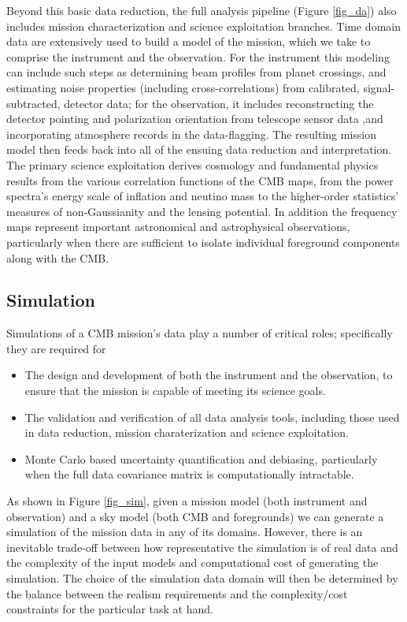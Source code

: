 Beyond this basic data reduction, the full analysis pipeline (Figure \ref{fig_da}) also includes mission characterization and science exploitation branches. Time domain data are extensively used to build a model of the mission, which we take to comprise the instrument and the observation. For the instrument this modeling can include such steps as determining beam profiles from planet crossings, and estimating noise properties (including cross-correlations) from calibrated, signal-subtracted, detector data; for the observation, it includes reconstructing the detector pointing and polarization orientation from telescope sensor data ,and incorporating atmosphere records in the data-flagging. The resulting mission model then feeds back into all of the ensuing data reduction and interpretation. The primary science exploitation derives cosmology and fundamental physics results from the various correlation functions of the CMB maps, from the power spectra's energy scale of inflation and neutino mass to the higher-order statistics'  measures of non-Gaussianity and the lensing potential. In addition the frequency maps represent important astronomical and astrophysical observations, particularly when there are sufficient to isolate individual foreground components along with the CMB. 

\subsection{Simulation}
Simulations of a CMB mission's data play a number of critical roles; specifically they are required for
\begin{itemize}
\item The design and development of both the instrument and the observation, to ensure that the mission is capable of meeting its science goals.
\item The validation and verification of all data analysis tools, including those used in data reduction, mission charaterization and science exploitation.
\item Monte Carlo based uncertainty quantification and debiasing, particularly when the full data covariance matrix is computationally intractable.
\end{itemize}

As shown in Figure \ref{fig_sim}, given a mission model (both instrument and observation) and a sky model (both CMB and foregrounds) we can generate a simulation of the mission data in any of its domains. However, there is an inevitable trade-off between how representative the simulation is of real data and the complexity of the input models and computational cost of generating the simulation. The choice of the simulation data domain will then be determined by the balance between the realism requirements and the complexity/cost constraints for the particular task at hand.

